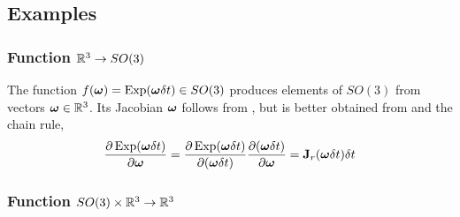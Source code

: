 %



\subsection{Examples}

\subsubsection{Function $\bbR^3\to SO(3)$} 
\label{sec:jac_R3toSO3}

The function $f(\bw) = \Exp(\bw\dt)\in SO(3)$ produces elements of $SO(3)$ from vectors $\bw\in\bbR^3$. 
Its Jacobian \wrt $\bw$ follows from , but is better obtained from  and the chain rule,
%
\begin{align*}
\dpar{\Exp(\bw\dt)}{\bw}
= \dpar{\Exp(\bw\dt)}{(\bw\dt)}\dpar{(\bw\dt)}{\bw} 
= \bfJ_r(\bw\dt)\dt
\end{align*}
%


\subsubsection{Function $SO(3)\times\bbR^3\to\bbR^3$} 
\label{sec:jac_SO3xR3toR3}

